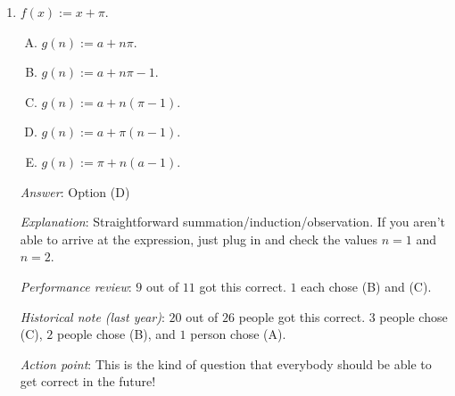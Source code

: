 \documentclass[10pt]{amsart}
\begin{document}
\begin{enumerate}
  {\em Answer}: Option (E)

  {\em Explanation}: Since $f$ is increasing, if $f(a_1) < a_1$, then
  $f(f(a_1)) < f(a_1)$. we can inductively show that if $f(a_1) <
  a_1$, then $(a_n)$ is decreasing. If $f(a_1) = a_1$, then $(a_n)$ is
  constant. If $f(a_1) > a_1$, then $(a_n)$ is increasing. Any of these
  cases may occur (as we can see using specific example from the
  previous problem). So, $(a_n)$ is either increasing, decreasing or
  constant, but which case occurs depends on the value of $a_1$ and
  the nature of $f$.

  For a function $f: \R \to \R$ and a particular element $a \in \R$,
  define $g: \N \to \R$ by $g(n) = f(f(\dots(f(a))\dots))$ with the
  $f$ occurring $n - 1$ times. Thus, $g(1) = a$, $g(2) = f(a)$, and so
  on. Choose the right expression for $g$ for each of these choices of $f$.

  {\em Performance review}: $7$ out of $11$ got this correct. $2$
  chose (A), $1$ each chose (C) and (D).

 {\em Historical note (last year)}: $11$ ouot of $26$ people got this
  correct. $6$ people chose (D), $6$ people chose (A), $2$ people
  chose (B), and $1$ person left the question blank.
\item $f(x) := x + \pi$.
  \begin{enumerate}[(A)]
  \item $g(n) := a + n\pi$.
  \item $g(n) := a + n\pi - 1$.
  \item $g(n) := a + n(\pi - 1)$.
  \item $g(n) := a + \pi(n - 1)$.
  \item $g(n) := \pi + n(a - 1)$.
  \end{enumerate}

  {\em Answer}: Option (D)

  {\em Explanation}: Straightforward
  summation/induction/observation. If you aren't able to arrive at the
  expression, just plug in and check the values $n = 1$ and $n = 2$.

  {\em Performance review}: $9$ out of $11$ got this correct. $1$ each
  chose (B) and (C).

  {\em Historical note (last year)}: $20$ out of $26$ people got this
  correct. $3$ people chose (C), $2$ people chose (B), and $1$ person
  chose (A).

  {\em Action point}: This is the kind of question that everybody
  should be able to get correct in the future!


\end{enumerate}
\end{document}
